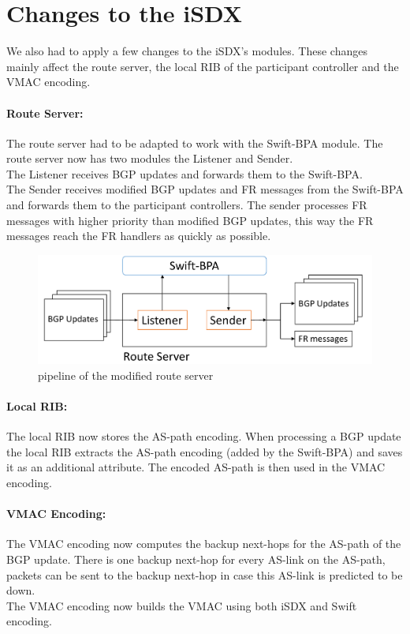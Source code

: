 \section{\label{chapter4:Changes_to_the_iSDX}Changes to the iSDX}

We also had to apply a few changes to the iSDX's modules. These changes mainly affect the route server, the local RIB of the participant controller and the VMAC encoding. 

\paragraph{\label{chapter4:Changes to the iSDX:route server}Route Server:}

The route server had to be adapted to work with the Swift-BPA module. 
The route server now has two modules the Listener and Sender. \\
The Listener receives BGP updates and forwards them to the Swift-BPA. \\
The Sender receives modified BGP updates and FR messages from the Swift-BPA and forwards them to the participant controllers. The sender processes FR messages with higher priority than modified BGP updates, this way the FR messages reach the FR handlers as quickly as possible. 

\begin{figure}[h]
\center
\includegraphics[scale = 0.45]{Figures/design_route_server_cropped2.pdf}
\caption{pipeline of the modified route server}
\end{figure}


\paragraph{\label{chapter4:Changes to the iSDX:local RIB}Local RIB:}

The local RIB now stores the AS-path encoding. When processing a BGP update the local RIB extracts the AS-path encoding (added by the Swift-BPA) and saves it as an additional attribute. The encoded AS-path is then used in the VMAC encoding. 

\paragraph{\label{chapter4:Changes to the iSDX:Vmac Encoding}VMAC Encoding:}
The VMAC encoding now computes the backup next-hops for the AS-path of the BGP update. There is one backup next-hop for every AS-link on the AS-path, packets can be sent to the backup next-hop in case this AS-link is predicted to be down. \\
The VMAC encoding now builds the VMAC using both iSDX and Swift encoding. \\

\newpage
